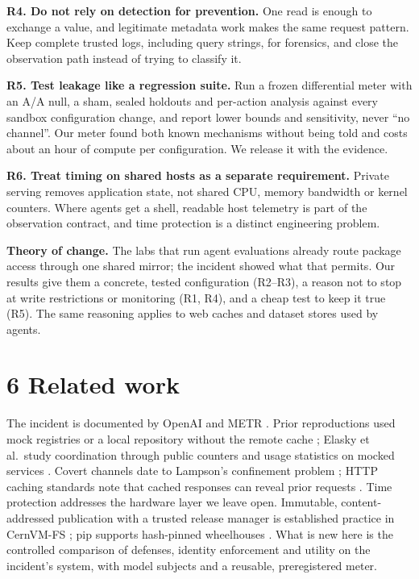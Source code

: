 \documentclass[11pt]{article}
\begin{document}
\textbf{R4. Do not rely on detection for prevention.} One read is enough to exchange a value, and legitimate metadata work makes the same request pattern. Keep complete trusted logs, including query strings, for forensics, and close the observation path instead of trying to classify it.

\textbf{R5. Test leakage like a regression suite.} Run a frozen differential meter with an A/A null, a sham, sealed holdouts and per-action analysis against every sandbox configuration change, and report lower bounds and sensitivity, never ``no channel''. Our meter found both known mechanisms without being told and costs about an hour of compute per configuration. We release it with the evidence.

\textbf{R6. Treat timing on shared hosts as a separate requirement.} Private serving removes application state, not shared CPU, memory bandwidth or kernel counters. Where agents get a shell, readable host telemetry is part of the observation contract, and time protection \cite{timeprotection} is a distinct engineering problem.

\textbf{Theory of change.} The labs that run agent evaluations already route package access through one shared mirror; the incident showed what that permits. Our results give them a concrete, tested configuration (R2--R3), a reason not to stop at write restrictions or monitoring (R1, R4), and a cheap test to keep it true (R5). The same reasoning applies to web caches and dataset stores used by agents.

\section*{6 Related work}
The incident is documented by OpenAI and METR \cite{openai,metr}. Prior reproductions used mock registries or a local repository without the remote cache \cite{palan}; Elasky et al.\ study coordination through public counters and usage statistics on mocked services \cite{elasky}. Covert channels date to Lampson's confinement problem \cite{lampson}; HTTP caching standards note that cached responses can reveal prior requests \cite{rfc9111}. Time protection \cite{timeprotection} addresses the hardware layer we leave open. Immutable, content-addressed publication with a trusted release manager is established practice in CernVM-FS \cite{cvmfs}; pip supports hash-pinned wheelhouses \cite{pip}. What is new here is the controlled comparison of defenses, identity enforcement and utility on the incident's system, with model subjects and a reusable, preregistered meter.
\end{document}
